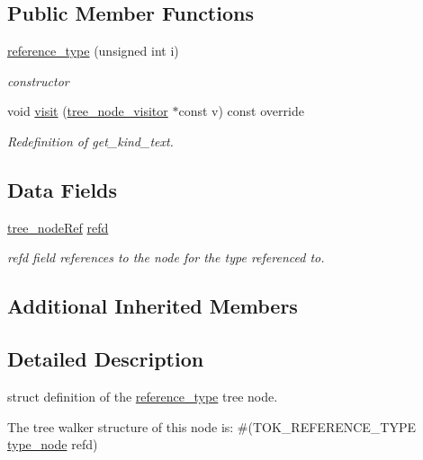 \subsection*{Public Member Functions}
\begin{DoxyCompactItemize}
\item 
\hyperlink{structreference__type_a896873aa25bf963c03e4b219f05d5b40}{reference\+\_\+type} (unsigned int i)
\begin{DoxyCompactList}\small\item\em constructor \end{DoxyCompactList}\item 
void \hyperlink{structreference__type_aa5b63ca7df3884098382105ee8c1e128}{visit} (\hyperlink{classtree__node__visitor}{tree\+\_\+node\+\_\+visitor} $\ast$const v) const override
\begin{DoxyCompactList}\small\item\em Redefinition of get\+\_\+kind\+\_\+text. \end{DoxyCompactList}\end{DoxyCompactItemize}
\subsection*{Data Fields}
\begin{DoxyCompactItemize}
\item 
\hyperlink{tree__node_8hpp_a6ee377554d1c4871ad66a337eaa67fd5}{tree\+\_\+node\+Ref} \hyperlink{structreference__type_ab117e53579dab500e46fa6fb799e40f9}{refd}
\begin{DoxyCompactList}\small\item\em refd field references to the node for the type referenced to. \end{DoxyCompactList}\end{DoxyCompactItemize}
\subsection*{Additional Inherited Members}


\subsection{Detailed Description}
struct definition of the \hyperlink{structreference__type}{reference\+\_\+type} tree node. 

The tree walker structure of this node is\+: \#(T\+O\+K\+\_\+\+R\+E\+F\+E\+R\+E\+N\+C\+E\+\_\+\+T\+Y\+PE \hyperlink{structtype__node}{type\+\_\+node} refd) 


